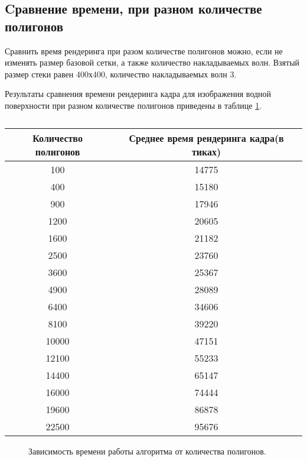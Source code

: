 \subsection{Cравнение времени, при разном количестве полигонов}

Сравнить время рендеринга при разом количестве полигонов  можно, если не изменять размер базовой сетки, а также количество накладываемых волн. Взятый размер стеки равен 400х400, количество накладываемых волн 3.

Результаты сравнения времени рендеринга кадра для изображения водной поверхности при разном количестве полигонов приведены в таблице \ref{tab:polygons}.

\begin{table}[h!]
	\caption{}
	\label{tab:polygons}
	\begin{center}
		\begin{tabular}{|c | c|} 
			\hline
			Количество полигонов & Среднее время рендеринга кадра(в тиках) \\  
			\hline
			100 & 14775  \\
			\hline
			400 &  15180 \\
			\hline
			900 &  17946 \\
			\hline
			1200 & 20605  \\
			\hline
			1600 &  21182  \\
			\hline
			2500 &  23760  \\
			\hline
			3600 &  25367 \\
			\hline
			4900 & 28089  \\
			\hline
			6400 &  34606 \\
			\hline
			8100 &  39220 \\
			\hline
			10000 & 47151 \\
			\hline
			12100 & 55233  \\
			\hline
			14400 & 65147  \\
			\hline
			16000 & 74444  \\
			\hline
			19600 & 86878  \\
			\hline
			22500 & 95676  \\
			\hline
		\end{tabular}
	\end{center}
\end{table}



\begin{figure}[h]
	\centering
	\captionsetup{justification=centering}
	\caption{Зависимость времени работы алгоритма от количества полигонов.}
	\label{plt:time_img}
	
\end{figure}


